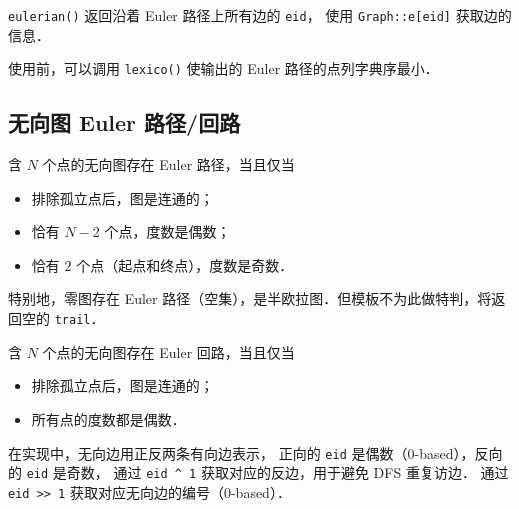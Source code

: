 {\tt eulerian()} 返回沿着 Euler 路径上所有边的 {\tt eid}，
使用 {\tt Graph::e[eid]} 获取边的信息．

使用前，可以调用 {\tt lexico()} 使输出的 Euler 路径的点列字典序最小．



\subsection{无向图 Euler 路径/回路}

含 $N$ 个点的无向图存在 Euler 路径，当且仅当

\begin{itemize}[noitemsep]
    \item 排除孤立点后，图是连通的；
    \item 恰有 $N - 2$ 个点，度数是偶数；
    \item 恰有 $2$ 个点（起点和终点），度数是奇数．
\end{itemize}

特别地，零图存在 Euler 路径（空集），是半欧拉图．但模板不为此做特判，将返回空的 {\tt trail}．

含 $N$ 个点的无向图存在 Euler 回路，当且仅当

\begin{itemize}[noitemsep]
    \item 排除孤立点后，图是连通的；
    \item 所有点的度数都是偶数．
\end{itemize}

在实现中，无向边用正反两条有向边表示，
正向的 {\tt eid} 是偶数（0-based），反向的 {\tt eid} 是奇数，
通过 {\tt eid \textasciicircum{} 1} 获取对应的反边，用于避免 DFS 重复访边．
通过 {\tt eid >> 1} 获取对应无向边的编号（0-based）．



\newpage
